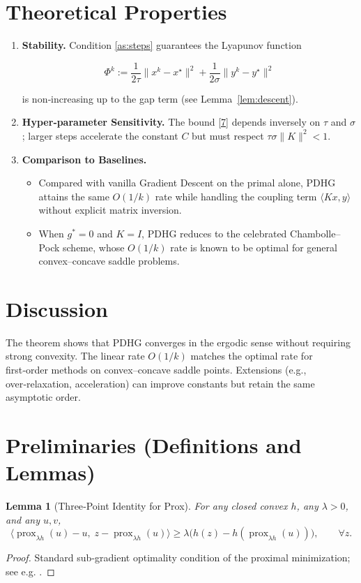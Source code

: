 \documentclass{article}
\newtheorem{lemma}{Lemma}
\begin{document}
\section*{Theoretical Properties}
\begin{enumerate}[nosep]
\item \textbf{Stability.} Condition \eqref{as:steps} guarantees the Lyapunov function  

\[
\Phi^{k}:=\frac{1}{2\tau}\|x^{k}-x^{\star}\|^{2}
           +\frac{1}{2\sigma}\|y^{k}-y^{\star}\|^{2}
\]

is non‑increasing up to the gap term (see Lemma~\ref{lem:descent}).
\item \textbf{Hyper‑parameter Sensitivity.} The bound \eqref{7} depends inversely on $\tau$ and $\sigma$; larger steps accelerate the constant $C$ but must respect $\tau\sigma\|K\|^{2}<1$.
\item \textbf{Comparison to Baselines.}
\begin{itemize}[nosep]
\item Compared with vanilla Gradient Descent on the primal alone, PDHG attains the same $O(1/k)$ rate while handling the coupling term $\langle Kx,y\rangle$ without explicit matrix inversion.
\item When $g^{*}=0$ and $K=I$, PDHG reduces to the celebrated Chambolle–Pock scheme, whose $O(1/k)$ rate is known to be optimal for general convex–concave saddle problems.
\end{itemize}
\end{enumerate}

\section*{Discussion}
The theorem shows that PDHG converges in the ergodic sense without requiring strong convexity. The linear rate $O(1/k)$ matches the optimal rate for first‑order methods on convex–concave saddle points. Extensions (e.g., over‑relaxation, acceleration) can improve constants but retain the same asymptotic order.

\section*{Preliminaries (Definitions and Lemmas)}
\begin{lemma}[Three‑Point Identity for Prox]\label{lem:prox}
For any closed convex $h$, any $\lambda>0$, and any $u,v$,
\[
\langle \operatorname{prox}_{\lambda h}(u)-u,\;z-\operatorname{prox}_{\lambda h}(u)\rangle
\ge
\lambda\bigl(h(z)-h(\operatorname{prox}_{\lambda h}(u))\bigr),\qquad\forall z.
\tag{9}
\]
\end{lemma}
\begin{proof}
Standard sub‑gradient optimality condition of the proximal minimization; see e.g. \cite{Bauschke2011}.
\end{proof}
\end{document}
